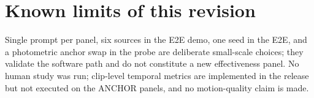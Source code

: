 \documentclass[letterpaper]{article}
\begin{document}
\section{Known limits of this revision}

Single prompt per panel, six sources in the E2E demo, one seed in the
E2E, and a photometric anchor swap in the probe are deliberate
small-scale choices; they validate the software path and do not
constitute a new effectiveness panel. No human study was run; clip-level
temporal metrics are implemented in the release but not executed on the
ANCHOR panels, and no motion-quality claim is made.


\end{document}
